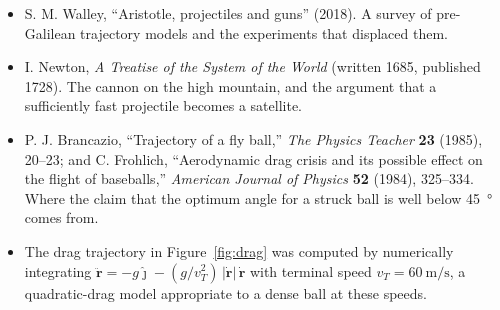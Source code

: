 \documentclass[11pt,twoside,openany]{book}
\begin{document}
\begin{itemize}[itemsep=3pt]
  \item S. M. Walley, ``Aristotle, projectiles and guns'' (2018). A survey of pre-Galilean trajectory models and the experiments that displaced them.
  \item I. Newton, \emph{A Treatise of the System of the World} (written 1685, published 1728). The cannon on the high mountain, and the argument that a sufficiently fast projectile becomes a satellite.
  \item P. J. Brancazio, ``Trajectory of a fly ball,'' \emph{The Physics Teacher} \textbf{23} (1985), 20--23; and C. Frohlich, ``Aerodynamic drag crisis and its possible effect on the flight of baseballs,'' \emph{American Journal of Physics} \textbf{52} (1984), 325--334. Where the claim that the optimum angle for a struck ball is well below \SI{45}{\degree} comes from.
  \item The drag trajectory in Figure~\ref{fig:drag} was computed by numerically integrating $\ddot{\mathbf{r}} = -g\hat{\mathbf{\jmath}} - (g/v_T^2)\,|\dot{\mathbf{r}}|\,\dot{\mathbf{r}}$ with terminal speed $v_T = \SI{60}{\metre\per\second}$, a quadratic-drag model appropriate to a dense ball at these speeds.
\end{itemize}
\end{document}
